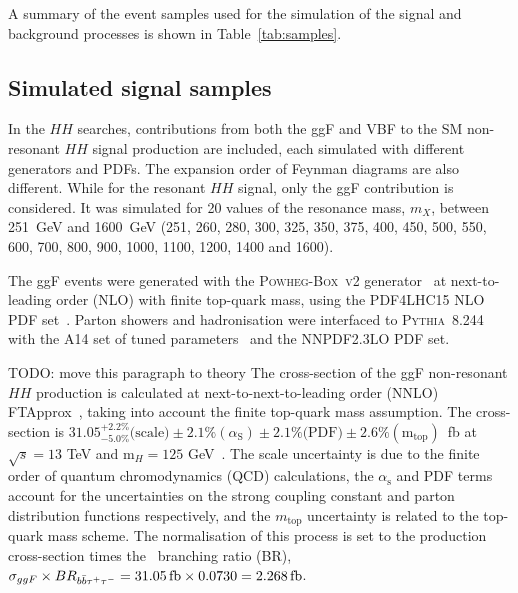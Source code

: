A summary of the event samples used for the simulation of the signal and background
processes is shown in Table~\ref{tab:samples}.
\begin{landscape}
\end{landscape}
\subsection{Simulated signal samples}

In the $HH$ searches, contributions from both the ggF and VBF to the 
SM non-resonant $HH$ signal production are included, 
each simulated with different generators and PDFs.
The expansion order of Feynman diagrams are also different. 
While for the resonant $HH$ signal, only the ggF contribution 
is considered.
It was simulated for 20 values of the resonance mass, $m_{X}$,
between 251~GeV and 1600~GeV
(251, 260, 280, 300, 325, 350, 375,
 400, 450, 500, 550, 600, 700, 800, 
 900, 1000, 1100, 1200, 1400 and 1600).

The ggF events were generated with 
the \textsc{Powheg-Box~v2} generator~\cite{Alioli:2010xd}
at next-to-leading order (NLO) with finite top-quark mass,
using the \textsc{PDF4LHC15} NLO PDF set~\cite{Butterworth:2015oua}.
Parton showers and hadronisation were interfaced to 
\textsc{Pythia~8.244}~\cite{Sjostrand:2007gs}
with the A14 set of tuned parameters~\cite{ATL-PHYS-PUB-2014-021,ATLAS:2012uec} 
and the \textsc{NNPDF2.3LO} PDF set.


TODO: move this paragraph to theory 
The cross-section of the ggF non-resonant $HH$ production is
calculated at next-to-next-to-leading order (NNLO) FTApprox~\cite{Grazzini:2018bsd},
taking into account the finite top-quark mass assumption. The cross-section is \linebreak
\mbox{$31.05^{+2.2\%}_{-5.0\%}\text{(scale)}\pm 2.1\%(\alpha_\text{S})\pm 2.1\%\text{(PDF)}\pm 2.6\%(\text{m}_\text{top})$ fb}
at $\sqrt{s}=13$ TeV and $\text{m}_{H}=125$ GeV~\cite{dihiggs-twiki}.
The scale uncertainty is due to 
the finite order of quantum chromodynamics (QCD) calculations,
the $\alpha_\text{s}$ and PDF terms 
account for the uncertainties on the strong coupling constant 
and parton distribution functions respectively, and the 
$m_\text{top}$ uncertainty is related to the top-quark mass scheme.
The normalisation of this process is set to the production cross-section 
times the \bbtautau\ branching ratio (BR), \linebreak
\mbox{$\sigma_{ggF} \times BR_{b\bar{b}\tau^{+}\tau^{-}}  = \SI{31.05}{fb} \times 0.0730  =  \SI{2.268}{fb}$}.  



